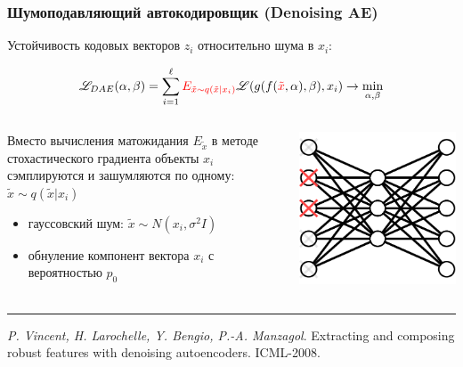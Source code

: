 \documentclass[fullscreen=true, bookmarks=true, hyperref={pdfencoding=unicode}]{beamer}
\begin{document}
\begin{frame}
  \frametitle{Шумоподавляющий автокодировщик (Denoising AE)}

  Устойчивость кодовых векторов $z_i$ относительно шума в $x_i$:

  $$ \mathscr{L}_{DAE}(\alpha, \beta) = \sum\limits_{i = 1}^\ell {\color{red} E_{\tilde x \sim q(\tilde x|x_i)}}
  \mathscr{L}(g(f({\color{red}\tilde x}, \alpha), \beta),x_i) \to \min\limits_{\alpha, \beta}$$

  \begin{columns}
      \begin{column}{.6\paperwidth}
        Вместо вычисления матожидания $E_{\tilde x}$ в методе стохастического градиента объекты $x_i$ сэмплируются и зашумляются по одному: $\tilde x \sim q(\tilde x|x_i)$
        \begin{itemize}
          \item гауссовский шум: $\tilde x \sim N(x_i, \sigma^2 I)$
          \item обнуление компонент вектора $x_i$ с вероятностью $p_0$
        \end{itemize}
      \end{column}
      \begin{column}{.3\paperwidth}
        \includegraphics[keepaspectratio,
                       width=.3\paperwidth]{denoising-AE.png}
      \end{column}
  \end{columns}

  \noindent\rule{8cm}{0.4pt}

  {\small
  {\it P. Vincent, H. Larochelle, Y. Bengio, P.-A. Manzagol}. Extracting and composing robust features with denoising autoencoders. ICML-2008.}
\end{frame}
\end{document}
